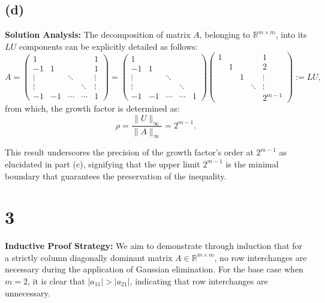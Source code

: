 \documentclass{article}
\begin{document}
\subsection{(d)}
\textbf{Solution Analysis:} The decomposition of matrix \(A\), belonging to \(\mathbb{R}^{m \times m}\), into its \(LU\) components can be explicitly detailed as follows:
\[
A = \begin{pmatrix}
1 & & & & 1 \\
-1 & 1 & & & 1 \\
\vdots & & \ddots & & \vdots \\
\vdots & & & \ddots & \vdots \\
-1 & -1 & \cdots & \cdots & 1
\end{pmatrix} = \begin{pmatrix}
1 & & & & \\
-1 & 1 & & & \\
\vdots & & \ddots & & \\
\vdots & & & \ddots & \\
-1 & -1 & \cdots & \cdots & 1
\end{pmatrix} \begin{pmatrix}
1 & & & & 1 \\
& 1 & & & 2 \\
& & 1 & & \vdots \\
& & & \ddots & \vdots \\
& & & & 2^{m-1}
\end{pmatrix} := L U,
\]
from which, the growth factor is determined as:
\[
\rho = \frac{\|U\|_{\infty}}{\|A\|_{\infty}} = 2^{m-1}.
\]

This result underscores the precision of the growth factor's order at \(2^{m-1}\) as elucidated in part (c), signifying that the upper limit \(2^{m-1}\) is the minimal boundary that guarantees the preservation of the inequality.
\section{3}
\textbf{Inductive Proof Strategy:} We aim to demonstrate through induction that for a strictly column diagonally dominant matrix \(A \in \mathbb{R}^{m \times m}\), no row interchanges are necessary during the application of Gaussian elimination. For the base case when \(m=2\), it is clear that \(|a_{11}| > |a_{21}|\), indicating that row interchanges are unnecessary.
\end{document}
